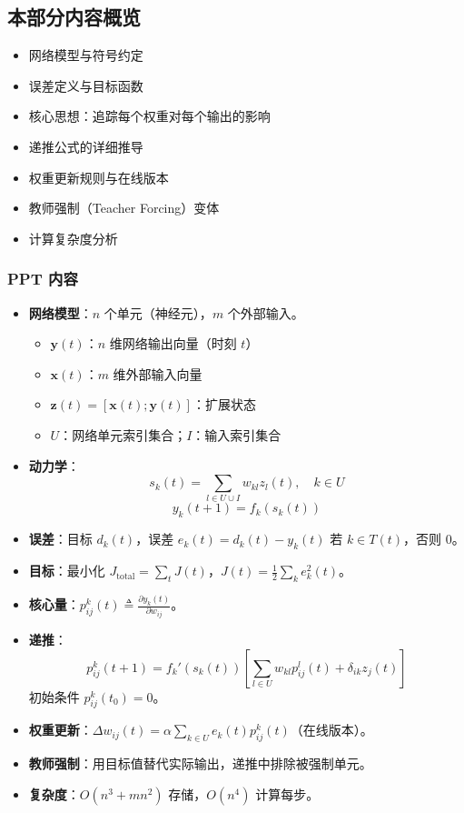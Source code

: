 \documentclass[journal,12pt,onecolumn]{IEEEtran}
\begin{document}
\subsection*{本部分内容概览}
\begin{itemize}
    \item 网络模型与符号约定
    \item 误差定义与目标函数
    \item 核心思想：追踪每个权重对每个输出的影响
    \item 递推公式的详细推导
    \item 权重更新规则与在线版本
    \item 教师强制（Teacher Forcing）变体
    \item 计算复杂度分析
\end{itemize}

\subsubsection*{PPT 内容}
\begin{itemize}
    \item \textbf{网络模型}：$n$ 个单元（神经元），$m$ 个外部输入。
        \begin{itemize}
            \item $\mathbf{y}(t)$：$n$ 维网络输出向量（时刻 $t$）
            \item $\mathbf{x}(t)$：$m$ 维外部输入向量
            \item $\mathbf{z}(t) = [\mathbf{x}(t); \mathbf{y}(t)]$：扩展状态
            \item $U$：网络单元索引集合；$I$：输入索引集合
        \end{itemize}
    \item \textbf{动力学}：
        \begin{equation}
            s_k(t) = \sum_{l \in U \cup I} w_{kl} z_l(t), \quad k \in U
        \end{equation}
        \begin{equation}
            y_k(t+1) = f_k(s_k(t))
        \end{equation}
    \item \textbf{误差}：目标 $d_k(t)$，误差 $e_k(t) = d_k(t) - y_k(t)$ 若 $k\in T(t)$，否则 0。
    \item \textbf{目标}：最小化 $J_{\text{total}} = \sum_{t} J(t)$，$J(t) = \frac{1}{2}\sum_k e_k^2(t)$。
    \item \textbf{核心量}：$p_{ij}^k(t) \triangleq \frac{\partial y_k(t)}{\partial w_{ij}}$。
    \item \textbf{递推}：
        \begin{equation}
            p_{ij}^k(t+1) = f_k'(s_k(t)) \left[ \sum_{l\in U} w_{kl} p_{ij}^l(t) + \delta_{ik} z_j(t) \right]
        \end{equation}
        初始条件 $p_{ij}^k(t_0)=0$。
    \item \textbf{权重更新}：$\Delta w_{ij}(t) = \alpha \sum_{k\in U} e_k(t) p_{ij}^k(t)$（在线版本）。
    \item \textbf{教师强制}：用目标值替代实际输出，递推中排除被强制单元。
    \item \textbf{复杂度}：$O(n^3 + mn^2)$ 存储，$O(n^4)$ 计算每步。
\end{itemize}
\end{document}
